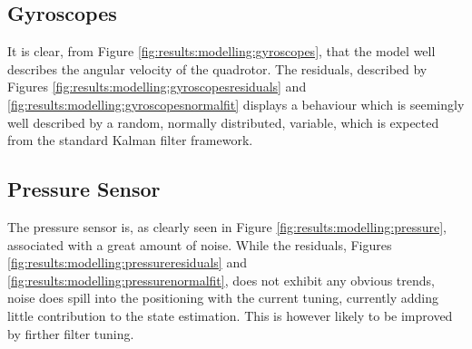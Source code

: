     \subsection{Gyroscopes}
        \label{ssec:results:modelling:gyroscopes}
        It is clear, from Figure \ref{fig:results:modelling:gyroscopes}, that
        the model well describes the angular velocity of the quadrotor.
        The residuals, described by Figures \ref{fig:results:modelling:gyroscopesresiduals}
        and \ref{fig:results:modelling:gyroscopesnormalfit}
        displays a behaviour which is seemingly well described by a random,
        normally distributed, variable, which is expected from the
        standard Kalman filter framework.

    \subsection{Pressure Sensor}
        The pressure sensor is, as clearly seen in Figure \ref{fig:results:modelling:pressure},
        associated with a great amount of noise. While the residuals,
        Figures \ref{fig:results:modelling:pressureresiduals} and \ref{fig:results:modelling:pressurenormalfit},
        does not exhibit any obvious trends, noise does spill into
        the positioning with the current tuning, currently adding little contribution
        to the state estimation. This is however likely to be improved by firther filter tuning.

